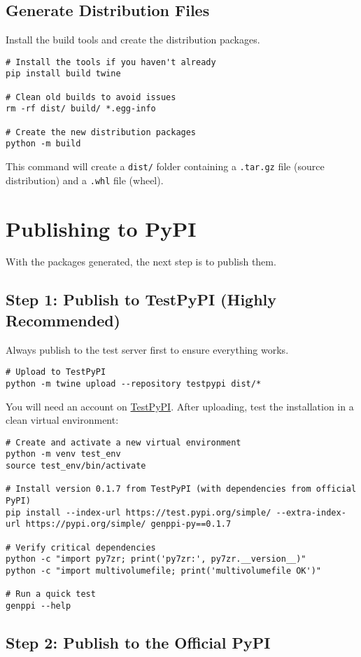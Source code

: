 \documentclass[11pt, a4paper]{article}
\begin{document}
\subsection{Generate Distribution Files}
Install the build tools and create the distribution packages.
\begin{lstlisting}[style=bashstyle]
# Install the tools if you haven't already
pip install build twine

# Clean old builds to avoid issues
rm -rf dist/ build/ *.egg-info

# Create the new distribution packages
python -m build
\end{lstlisting}
This command will create a \texttt{dist/} folder containing a \texttt{.tar.gz} file (source distribution) and a \texttt{.whl} file (wheel).

\section{Publishing to PyPI}
With the packages generated, the next step is to publish them.

\subsection{Step 1: Publish to TestPyPI (Highly Recommended)}
Always publish to the test server first to ensure everything works.
\begin{lstlisting}[style=bashstyle]
# Upload to TestPyPI
python -m twine upload --repository testpypi dist/*
\end{lstlisting}
You will need an account on \href{https://test.pypi.org/}{TestPyPI}. After uploading, test the installation in a clean virtual environment:
\begin{lstlisting}[style=bashstyle]
# Create and activate a new virtual environment
python -m venv test_env
source test_env/bin/activate

# Install version 0.1.7 from TestPyPI (with dependencies from official PyPI)
pip install --index-url https://test.pypi.org/simple/ --extra-index-url https://pypi.org/simple/ genppi-py==0.1.7

# Verify critical dependencies
python -c "import py7zr; print('py7zr:', py7zr.__version__)"
python -c "import multivolumefile; print('multivolumefile OK')"

# Run a quick test
genppi --help
\end{lstlisting}

\subsection{Step 2: Publish to the Official PyPI}
\end{document}
